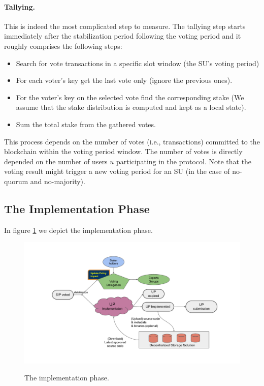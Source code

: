 \paragraph{Tallying.} This is indeed the most complicated step to measure. The tallying step starts immediately after the stabilization period following the voting period and it roughly comprises the following steps:
\begin{itemize}
\item Search for vote transactions in a specific slot window (the SU's voting period)
\item For each voter's key get the last vote only (ignore the previous ones).
\item For the voter's key on the selected vote find the corresponding stake (We assume that the stake distribution is computed and kept as a local state).
\item  Sum the total stake from the gathered votes.
\end{itemize}
This process depends on the number of votes (i.e., transactions) committed to the blockchain within the voting period window. The number of votes is directly depended on the number of users $u$ participating in the protocol. %
Note that the voting result might trigger a new voting period for an SU (in the case of no-quorum and no-majority).

\subsection{The Implementation Phase}
In figure \ref{implementation} we depict the implementation phase.

\begin{figure}[h!]
    \caption{The implementation phase.}
    \centering
    \includegraphics[width=1.0 \columnwidth,keepaspectratio]{figures/implementation_phase.pdf}
    \label{implementation}
\end{figure}

